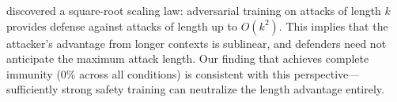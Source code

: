  \citet{fu2025short} discovered a square-root scaling law: adversarial training on attacks of length $k$ provides defense against attacks of length up to $O(k^2)$. This implies that the attacker's advantage from longer contexts is sublinear, and defenders need not anticipate the maximum attack length. Our finding that \claudesonnet achieves complete immunity (0\% \isr across all conditions) is consistent with this perspective---sufficiently strong safety training can neutralize the length advantage entirely.
